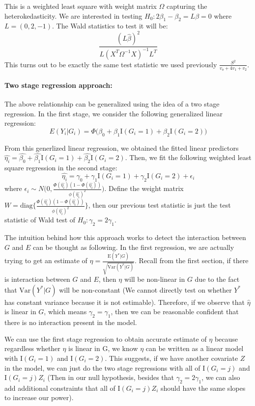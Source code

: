 \documentclass[
]{article}
\begin{document}
This is a weighted least square with weight matrix \(\Omega\) capturing
the heterokedasticity. We are interested in testing
\(H_0 : 2\beta_1 - \beta_2 = L\beta = 0\) where \(L = (0,2,-1)\). The
Wald statistics to test it will be:
\[ \frac{(L\hat{\beta})^2}{L(X^T \Omega^{-1}X)^{-1}L^T}\] This turns out
to be exactly the same test statistic we used previously
\(\frac{S^2}{v_o+4v_1+v_2}\).

\hypertarget{two-stage-regression-approach}{%
\paragraph{Two stage regression
approach:}\label{two-stage-regression-approach}}

The above relationship can be generalized using the idea of a two stage
regression. In the first stage, we consider the following generalized
linear regression:
\[ E(Y_i|G_i) = \Phi\bigg(\beta_0+ \beta_1 \text{I}(G_i =1) + \beta_2 \text{I}(G_i =2)\bigg)\]

From this generlized linear regression, we obtained the fitted linear
predictors
\(\hat{\eta_i} = \hat{\beta_0}+\hat{\beta_1}\text{I}(G_i =1) + \hat{\beta_2} \text{I}(G_i =2)\).
Then, we fit the following weighted least square regression in the
second stage:
\[ \hat{\eta_i} = \gamma_0 +\gamma_1  \text{I}(G_i =1) + \gamma_2 \text{I}(G_i =2) +\epsilon_i\]
where
\(\epsilon_i \sim N\bigg(0,\frac{\Phi(\hat{\eta_i})(1-\Phi(\hat{\eta_i}))}{\phi(\hat{\eta_i})^2} \bigg)\).
Define the weight matrix
\(W = \text{diag}\{\frac{\Phi(\hat{\eta_i})(1-\Phi(\hat{\eta_i}))}{\phi(\hat{\eta_i})^2}\}\),
then our previous test statistic is just the test statistic of Wald test
of \(H_0:\gamma_2 = 2\gamma_1\).

The intuition behind how this approach works to detect the interaction
between \(G\) and \(E\) can be thought as following. In the first
regression, we are actually trying to get an estimate of
\(\eta = \frac{\text{E}(Y^*|G)}{\sqrt{\text{Var}(Y^*|G)}}\). Recall from
the first section, if there is interaction between \(G\) and \(E\), then
\(\eta\) will be non-linear in \(G\) due to the fact that
\(\text{Var}(Y^*|G)\) will be non-constant (We cannot directly test on
whether \(Y^*\) has constant variance because it is not estimable).
Therefore, if we observe that \(\hat{\eta}\) is linear in \(G\), which
means \(\gamma_2 = \gamma_1\), then we can be reasonable confident that
there is no interaction present in the model.

We can use the first stage regression to obtain accurate estimate of
\(\eta\) because regardless whether \(\eta\) is linear in G, we know
\(\eta\) can be written as a linear model with \(\text{I}(G_i =1)\) and
\(\text{I}(G_i =2)\). This suggests, if we have another covariate \(Z\)
in the model, we can just do the two stage regressions with all of
\(\text{I}(G_i =j)\) and \(\text{I}(G_i =j)Z_i\) (Then in our null
hypothesis, besides that \(\gamma_2 = 2 \gamma_1\), we can also add
additional constraints that all of \(\text{I}(G_i =j)Z_i\) should have
the same slopes to increase our power).
\end{document}
